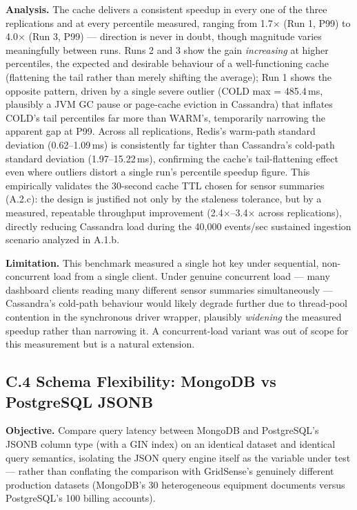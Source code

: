 \documentclass[11pt, a4paper]{article}
\makeatletter
\renewcommand{\_}{\origunderscore\penalty\z@\hskip\z@skip}
\renewcommand{\{}{\origlbrace\penalty\z@\hskip\z@skip}
\renewcommand{\}}{\origrbrace\penalty\z@\hskip\z@skip}
\makeatother
\begin{document}
\textbf{Analysis.} The cache delivers a consistent speedup in every one of the three replications and at every percentile measured, ranging from 1.7$\times$ (Run 1, P99) to 4.0$\times$ (Run 3, P99) --- direction is never in doubt, though magnitude varies meaningfully between runs. Runs 2 and 3 show the gain \textit{increasing} at higher percentiles, the expected and desirable behaviour of a well-functioning cache (flattening the tail rather than merely shifting the average); Run 1 shows the opposite pattern, driven by a single severe outlier (COLD max = 485.4\,ms, plausibly a JVM GC pause or page-cache eviction in Cassandra) that inflates COLD's tail percentiles far more than WARM's, temporarily narrowing the apparent gap at P99. Across all replications, Redis's warm-path standard deviation (0.62--1.09\,ms) is consistently far tighter than Cassandra's cold-path standard deviation (1.97--15.22\,ms), confirming the cache's tail-flattening effect even where outliers distort a single run's percentile speedup figure. This empirically validates the 30-second cache TTL chosen for sensor summaries (A.2.c): the design is justified not only by the staleness tolerance, but by a measured, repeatable throughput improvement (2.4$\times$--3.4$\times$ across replications), directly reducing Cassandra load during the 40,000 events/sec sustained ingestion scenario analyzed in A.1.b.

\textbf{Limitation.} This benchmark measured a single hot key under sequential, non-concurrent load from a single client. Under genuine concurrent load --- many dashboard clients reading many different sensor summaries simultaneously --- Cassandra's cold-path behaviour would likely degrade further due to thread-pool contention in the synchronous driver wrapper, plausibly \textit{widening} the measured speedup rather than narrowing it. A concurrent-load variant was out of scope for this measurement but is a natural extension.

\subsection*{C.4 Schema Flexibility: MongoDB vs PostgreSQL JSONB}

\textbf{Objective.} Compare query latency between MongoDB and PostgreSQL's JSONB column type (with a GIN index) on an identical dataset and identical query semantics, isolating the JSON query engine itself as the variable under test --- rather than conflating the comparison with GridSense's genuinely different production datasets (MongoDB's 30 heterogeneous equipment documents versus PostgreSQL's 100 billing accounts).
\end{document}
